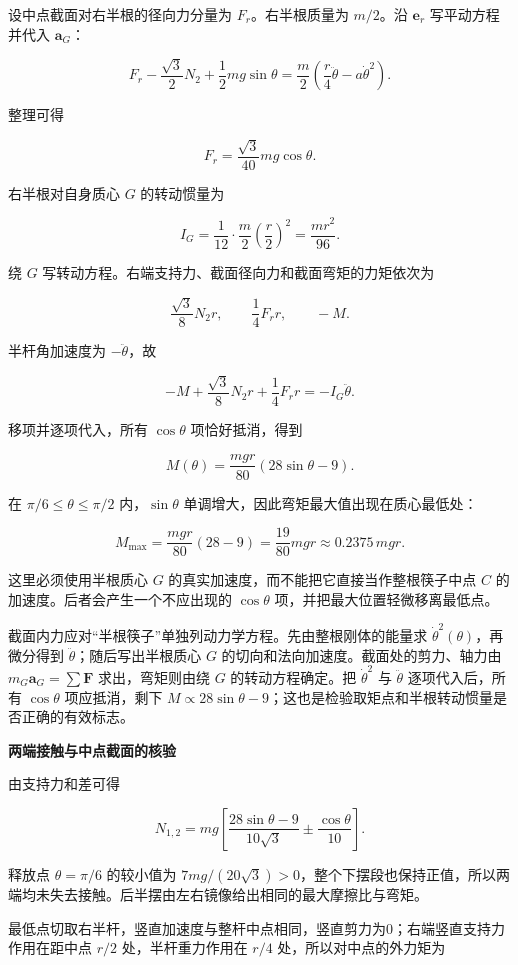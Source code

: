 \documentclass[12pt,a4paper,UTF8]{ctexart}
\begin{document}
设中点截面对右半根的径向力分量为 \(F_r\)。右半根质量为 \(m/2\)。沿
\(\bm e_r\) 写平动方程并代入 \(\bm a_G\)：

\[F_r-\frac{\sqrt3}{2}N_2+\frac12mg\sin\theta
=\frac m2\left(\frac r4\ddot\theta-a\dot\theta^2\right).\]

整理可得

\[F_r=\frac{\sqrt3}{40}mg\cos\theta.\]

右半根对自身质心 \(G\) 的转动惯量为

\[I_G=\frac1{12}\cdot\frac m2\left(\frac r2\right)^2
=\frac{mr^2}{96}.\]

绕 \(G\) 写转动方程。右端支持力、截面径向力和截面弯矩的力矩依次为

\[\frac{\sqrt3}{8}N_2r,\qquad \frac14F_rr,\qquad -M.\]

半杆角加速度为 \(-\ddot\theta\)，故

\[-M+\frac{\sqrt3}{8}N_2r+\frac14F_rr
=-I_G\ddot\theta.\]

移项并逐项代入，所有 \(\cos\theta\) 项恰好抵消，得到

\[\boxed{
M(\theta)=\frac{mgr}{80}(28\sin\theta-9)
}.\]

在 \(\pi/6\le\theta\le\pi/2\) 内，\(\sin\theta\)
单调增大，因此弯矩最大值出现在质心最低处：

\[\boxed{
M_{\max}=\frac{mgr}{80}(28-9)=\frac{19}{80}mgr
\approx0.2375\,mgr
}.\]

这里必须使用半根质心 \(G\) 的真实加速度，而不能把它直接当作整根筷子中点
\(C\) 的加速度。后者会产生一个不应出现的 \(\cos\theta\)
项，并把最大位置轻微移离最低点。

截面内力应对``半根筷子''单独列动力学方程。先由整根刚体的能量求
\(\dot\theta^2(\theta)\)，再微分得到 \(\ddot\theta\)；随后写出半根质心
\(G\) 的切向和法向加速度。截面处的剪力、轴力由 \(m_G\bm a_G=\sum\bm F\)
求出，弯矩则由绕 \(G\) 的转动方程确定。把 \(\dot\theta^2\) 与
\(\ddot\theta\) 逐项代入后，所有 \(\cos\theta\) 项应抵消，剩下
\(M\propto28\sin\theta-9\)；这也是检验取矩点和半根转动惯量是否正确的有效标志。

\textbf{两端接触与中点截面的核验}

由支持力和差可得

\[N_{1,2}=mg\left[\frac{28\sin\theta-9}{10\sqrt3}
\pm\frac{\cos\theta}{10}\right].\]

释放点 \(\theta=\pi/6\) 的较小值为
\(7mg/(20\sqrt3)>0\)，整个下摆段也保持正值，所以两端均未失去接触。后半摆由左右镜像给出相同的最大摩擦比与弯矩。

最低点切取右半杆，竖直加速度与整杆中点相同，竖直剪力为0；右端竖直支持力作用在距中点
\(r/2\) 处，半杆重力作用在 \(r/4\) 处，所以对中点的外力矩为
\end{document}
